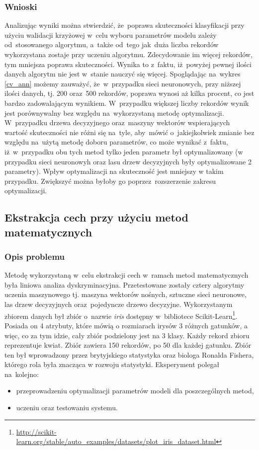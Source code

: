 \subsubsection{Wnioski}
Analizując wyniki można stwierdzić, że~poprawa skuteczności klasyfikacji przy użyciu walidacji krzyżowej w~celu wyboru parametrów modelu zależy od~stosowanego algorytmu, a~także od~tego jak~duża liczba rekordów wykorzystana zostaje przy uczeniu algorytmu. Zdecydowanie im więcej rekordów, tym mniejsza poprawa skuteczności. Wynika to z~faktu, iż~powyżej pewnej ilości danych algorytm nie jest w~stanie nauczyć się więcej. Spoglądając na~wykres \ref{cv_ann} możemy zauważyć, że~w~przypadku sieci neuronowych, przy niższej ilości danych, tj. 200 oraz~500 rekordów, poprawa wynosi aż kilka procent, co jest bardzo zadowalającym wynikiem. W~przypadku większej liczby rekordów wynik jest porównywalny bez względu na~wykorzystaną metodę optymalizacji. W~przypadku drzewa decyzyjnego oraz~maszyny wektorów wspierających wartość skuteczności nie różni się na~tyle, aby~mówić o~jakiejkolwiek zmianie bez względu na~użytą metodę doboru parametrów, co może wynikać z~faktu, iż~w~przypadku obu tych metod tylko jeden parametr był optymalizowany (w przypadku sieci neuronowyh oraz lasu drzew decyzyjnych były optymalizowane 2 parametry). Wpływ optymalizacji na skuteczność jest mniejszy w takim przypadku. Zwiększyć można byłoby go poprzez~rozszerzenie zakresu optymalizacji.

\subsection{Ekstrakcja cech przy użyciu metod matematycznych}

\subsubsection{Opis problemu}
Metodę wykorzystaną w~celu ekstrakcji cech w~ramach metod matematycznych była liniowa analiza dyskryminacyjna. Przetestowane zostały cztery algorytmy uczenia maszynowego tj. maszyna wektorów nośnych, sztuczne sieci neuronowe, las drzew decyzyjnych oraz~pojedyncze drzewo decyzyjne. Wykorzystanym zbiorem danych był zbiór o~nazwie \textit{iris} dostępny w~bibliotece Scikit-Learn\footnote{\url{http://scikit-learn.org/stable/auto_examples/datasets/plot_iris_dataset.html}}. Posiada on 4 atrybuty, które mówią o rozmiarach irysów 3 różnych gatunków, a więc, co za tym idzie, cały zbiór podzielony jest na 3 klasy. Każdy rekord zbioru reprezentuje kwiat. Zbiór zawiera 150 rekordów, po 50 dla każdej gatunku. Zbiór ten był wprowadzony przez brytyjskiego statystyka oraz biologa Ronalda Fishera, którego rola była znacząca w rozwoju statystyki. Eksperyment polegał na~kolejno:
\begin{itemize}

\item przeprowadzeniu optymalizacji parametrów modeli dla poszczególnych metod,
\item uczeniu oraz testowaniu systemu.

\end{itemize}

